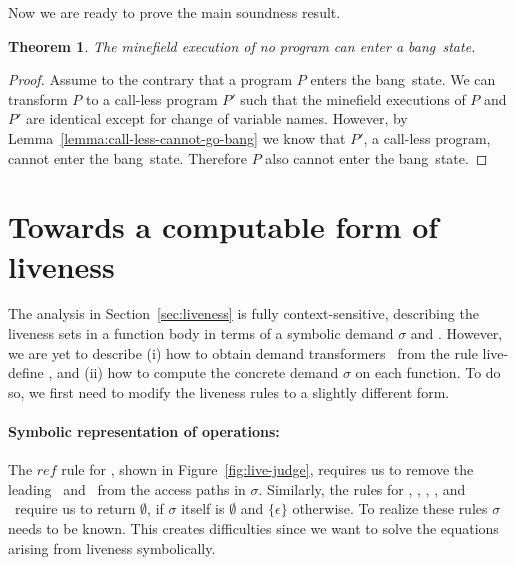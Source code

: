 \documentclass[9pt,preprint,nonatbib]{sigplanconf}
\newcommand{\bang}{\mbox{\sc bang}}
\newtheorem{theorem}{Theorem}[section]
\begin{document}
Now we are ready to prove the main soundness result.

\begin{theorem}
The  minefield  execution of  no  program  can enter  a
\bang\ state.
\end{theorem}
 
\begin{proof}
Assume to  the contrary that  a program $P$  enters the
\bang\  state.  We can  transform  $P$  to a  call-less
program $P'$ such that  the minefield executions of $P$
and $P'$  are identical  except for change  of variable
names.             However,                 by
Lemma~\ref{lemma:call-less-cannot-go-bang} we know that
$P'$,   a   call-less   program,   cannot   enter   the
\bang\  state.  Therefore   $P$  also  cannot  enter  the
\bang\ state.
\end{proof}
 




\section{Towards a  computable form of liveness}\label{sec:computing}
The analysis in Section~\ref{sec:liveness} is fully context-sensitive, 
describing the  liveness sets  in a function body in
terms of a symbolic demand $\sigma$  and \Lfonly. However, we are yet to
describe (i) how to obtain demand transformers \Lfonly\ from the rule
{\sc live-define} , and (ii) how to compute the concrete demand $\sigma$ on
each function. To do so, we first need to modify the liveness rules
to a slightly different form.

\paragraph{Symbolic representation of operations:}
The   $\mathit{ref}$   rule   for   \CONS,   shown   in
Figure~\ref{fig:live-judge}, requires us  to remove the
leading  \acar\ and  \acdr\  from the  access paths  in
$\sigma$.  Similarly, the rules  for \CAR, \CDR, \PRIM,
\NULLQ, and \SIF\ require  us to return $\emptyset$, if
$\sigma$      itself       is      $\emptyset$      and
$\lbrace\epsilon\rbrace$  otherwise.  To  realize these
rules  $\sigma$   needs  to  be  known.   This  creates
difficulties  since  we  want to  solve  the  equations
arising from liveness symbolically.
\end{document}
